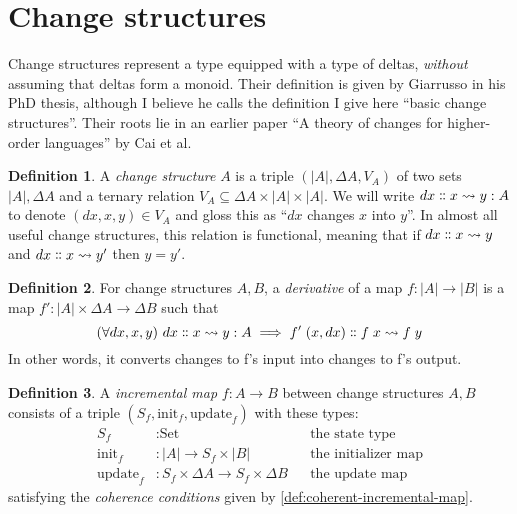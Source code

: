 \documentclass{article}
\theoremstyle{definition}
\newtheorem{definition}{Definition}
\theoremstyle{remark}
\newtheorem{remark}{Remark}
\newcommand\ensuretext[1]{{\ifmmode\text{#1}\else{#1}\fi}}
\newcommand\<\;                 %
\newcommand\quantifierspace{\ }
\newcommand\quantify[1]{({#1})\quantifierspace}
\newcommand\fa[1]{\quantify{\forall #1}}
\newcommand\changes[3]{{#1} \dblcolon {#2} \leadsto {#3}}
\newcommand\D\Delta
\newcommand\init{\text{init}}
\newcommand\update{\text{update}}
\newcommand\Set{\text{Set}}
\newcommand\State{\text{State}}
\newcommand\todo[1]{\ensuretext{\color{OrangeRed}#1}}
\begin{document}


\section{Change structures}

Change structures represent a type equipped with a type of deltas, \emph{without} assuming that deltas form a monoid.
Their definition is given by Giarrusso in his PhD thesis, although I believe he calls the definition I give here ``basic change structures''.
Their roots lie in an earlier paper ``A theory of changes for higher-order languages'' by Cai et al.

\begin{definition}
  A \emph{change structure} $A$ is a triple $(|A|, \Delta A, V_A)$ of two sets $|A|, \Delta A$ and a ternary relation $V_A \subseteq \Delta A \times |A| \times |A|$.
  We will write $\changes{dx}{x}{y} : A$ to denote $(dx, x, y) \in V_A$ and gloss this as ``$dx$ changes $x$ into $y$''.
  In almost all useful change structures, this relation is functional, meaning that if $\changes{dx}{x}{y}$ and $\changes{dx}{x}{y'}$ then $y = y'$.
\end{definition}

\begin{definition}
  For change structures $A,B$, a \emph{derivative} of a map $f : |A| \to |B|$ is a map $f' : |A| \times \D A \to \D B$ such that
%
  \[
  \fa{dx,x,y} \changes{dx}{x}{y} : A \implies \changes{f'\<(x,dx)}{f\<x}{f\<y}
  \]
%
  In other words, it converts changes to f's input into changes to f's output.
\end{definition}

\begin{definition}
  A \emph{incremental map} $f : A \to B$ between change structures $A,B$ consists of a triple $(S_f, \init_f, \update_f)$ with these types:
%
  \begin{align*}
    S_f &: \Set
    &&\text{the state type}
    \\
    \init_f &: |A| \to S_f \times |B|
    &&\text{the initializer map}
    \\
    \update_f &: S_f \times \D A \to S_f \times \D B
    &&\text{the update map}
  \end{align*}
%
  satisfying the \emph{coherence conditions} given by \cref{def:coherent-incremental-map}.
\end{definition}
\end{document}
